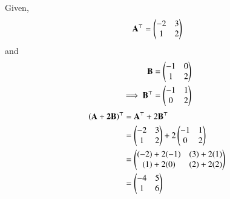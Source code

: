 Given,
\begin{align}
    \mathbf{A}^\top=\begin{pmatrix}-2&3\\1&2\end{pmatrix}
\end{align}
and 
\begin{align}
    \mathbf{B}=\begin{pmatrix}-1&0\\1&2\end{pmatrix}\\
    \implies \mathbf{B}^\top=\begin{pmatrix}-1&1\\0&2\end{pmatrix}
\end{align}
\begin{align}
   \left(\mathbf{A+2B}\right)^\top&=\mathbf{A}^\top+2\mathbf{B}^\top\\
   &=\begin{pmatrix}-2&3\\1&2\end{pmatrix}+2\begin{pmatrix}-1&1\\0&2\end{pmatrix}\\
   &=\begin{pmatrix}(-2)+2(-1)&(3)+2(1)\\(1)+2(0)&(2)+2(2)\end{pmatrix}\\
   &=\begin{pmatrix}-4&5\\1&6\end{pmatrix}
\end{align}